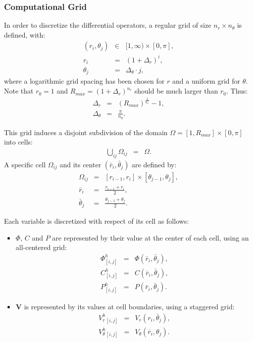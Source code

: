 \documentclass[final]{elsarticle}
\newcommand{\pars}[1]{\left(#1\right)}
\newcommand\bV{\boldsymbol{V}}
\begin{document}
\subsubsection{Computational Grid}
In order to discretize the differential operators, 
a regular grid of size $n_r \times n_\theta$ is defined, with:
\begin{eqnarray*}
(r_i,\theta_j) &\in& [1, \infty) \times [0,\pi], \\ 
r_i &=& (1+\Delta_r)^i, \\
\theta_j &=& \Delta_\theta \cdot j,
\end{eqnarray*}
where a logarithmic grid spacing has been chosen for $r$ and a uniform grid for $\theta$.
Note that $r_0 = 1$ and $R_{max} = (1+\Delta_r)^{n_r}$ should be much 
larger than $r_0$. Thus:
\begin{eqnarray*}
\Delta_r &=& \pars{R_{max}} ^ \frac{1}{n_r} - 1, \\
\Delta_\theta &=& \frac{\pi}{n_\theta}.
\end{eqnarray*}

This grid induces a disjoint subdivision of the domain 
$\Omega = [1, R_{max}] \times [0,\pi]$ into cells:
\begin{eqnarray*}
\bigcup_{ij}\Omega_{ij} &=& \Omega.
\end{eqnarray*}
A specific cell $\Omega_{ij}$ and its center $(\bar{r}_i, \bar{\theta}_j)$ are defined by:
\begin{eqnarray*}
\Omega_{ij} &=& [r_{i-1}, r_{i}] \times [\theta_{j-1}, \theta_{j}], \\
\bar{r}_i &=& \frac{r_{i-1} + r_{i}}{2}, \\
\bar{\theta}_j &=& \frac{\theta_{j-1} + \theta_{j}}{2}.
\end{eqnarray*}

Each variable is discretized with respect of its cell as follows:
\begin{itemize}
\item $\varPhi$, $C$ and $P$ are represented by their value at the center of each cell, 
using an all-centered grid:
\begin{eqnarray*}
\varPhi^h_{[i,j]} &=& \varPhi(\bar{r}_i, \bar{\theta}_j), \\
C^h_{[i,j]} &=& C(\bar{r}_i, \bar{\theta}_j), \\
P^h_{[i,j]} &=& P(\bar{r}_i, \bar{\theta}_j).
\end{eqnarray*}
\item $\bV$ is represented by its values at cell boundaries, using a staggered grid:
\begin{eqnarray*}
V_r^h{}_{[i,j]} &=& V_r(r_i, \bar{\theta}_j), \\
V_\theta^h{}_{[i,j]} &=& V_\theta(\bar{r}_i, {\theta}_j).
\end{eqnarray*}
\end{itemize}
\end{document}
